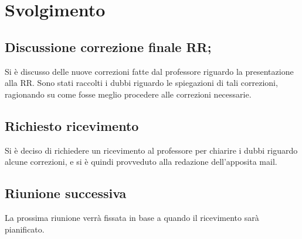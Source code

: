 \documentclass[]{article}
\begin{document}
	\newpage

	\section{Svolgimento}
		\subsection{Discussione correzione finale RR;}
		Si è discusso delle nuove correzioni fatte dal professore riguardo la presentazione alla RR.
		Sono stati raccolti i dubbi riguardo le spiegazioni di tali correzioni, ragionando su come fosse meglio procedere alle correzioni necessarie.\\

		\subsection{Richiesto ricevimento}
		Si è deciso di richiedere un ricevimento al professore per chiarire i dubbi riguardo alcune correzioni, e si è quindi provveduto alla redazione dell'apposita mail.\\

		\subsection{Riunione successiva}
		La prossima riunione verrà fissata in base a quando il ricevimento sarà pianificato.\\
\end{document}
